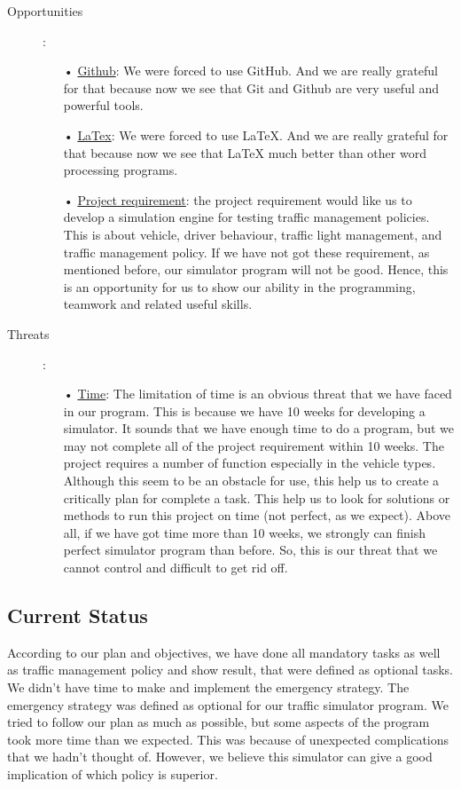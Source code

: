 \documentclass[11pt]{article}
\begin{document}
\begin{description}
\item[Opportunities]: 
	\begin{itemize}
	\item[•] \underline{Github}: We were forced to use GitHub. And we are really grateful for that because now we see that Git and Github are very useful and powerful tools.
	\item[•] \underline{LaTex}: We were forced to use LaTeX. And we are really grateful for that because now we see that LaTeX much better than other word processing programs.
	\item[•] \underline{Project requirement}: the project requirement would like us to develop a simulation engine for testing traffic management policies. This is about vehicle, driver behaviour, traffic light management, and traffic management policy. If we have not got these requirement, as mentioned before, our simulator program will not be good. Hence, this is an opportunity for us to show our ability in the programming, teamwork and related useful skills. 
	\end{itemize}				

\item[Threats]:
	\begin{itemize}
	\item[•] \underline{Time}: The limitation of time is an obvious threat that we have faced in our program. This is because  we have 10 weeks for developing a simulator. It sounds that we have enough time to do a program, but we may not complete all of the project requirement within 10 weeks. The project requires a number of function especially in the vehicle types. Although this seem to be an obstacle for use, this help us to create a critically plan for complete a task. This help us to look for solutions or methods to run this project on time (not perfect, as we expect). Above all, if we have got time more than 10 weeks, we strongly can finish perfect simulator program than before.  So, this is our threat that we cannot control and difficult to get rid off.
  	\end{itemize}					
\end{description}
	
\subsection{Current Status}
According to our plan and objectives, we have done all mandatory tasks as well as traffic management policy and show result, that were defined as optional tasks. We didn't have time to make and implement the emergency strategy. The emergency strategy was defined as optional for our traffic simulator program. We tried to follow our plan as much as possible, but some aspects of the program took more time than we expected. This was because of unexpected complications that we hadn't thought of. However, we believe this simulator can give a good implication of which policy is superior.
\end{document}

